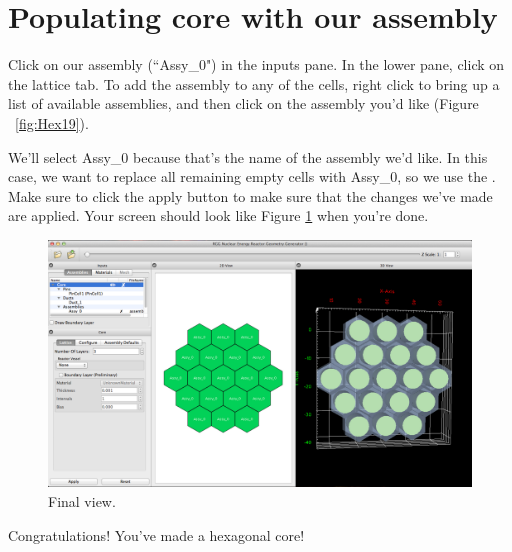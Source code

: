 \section{Populating core with our assembly}

Click on our assembly (``Assy\_0") in the inputs pane.  In the lower pane, click on the lattice tab.  To add the assembly to any of the cells, right click to bring up a list of available assemblies, and then click on the assembly you'd like (Figure ~\ref{fig:Hex19}).

We'll select Assy\_0 because that's the name of the assembly we'd like.  In this case, we want to replace all remaining empty cells with Assy\_0, so we use the . Make sure to click the apply button to make sure that the changes we've made are applied.  Your screen should look like Figure  \ref{fig:Hex20} when you're done.

\begin{figure}[H]
	\begin{center}
		\includegraphics[width=0.85\linewidth]{Images/hex-final-core.png}
		\caption{Final view.}
		\label{fig:Hex20}
	\end{center}
\end{figure}

Congratulations!  You've made a hexagonal core!